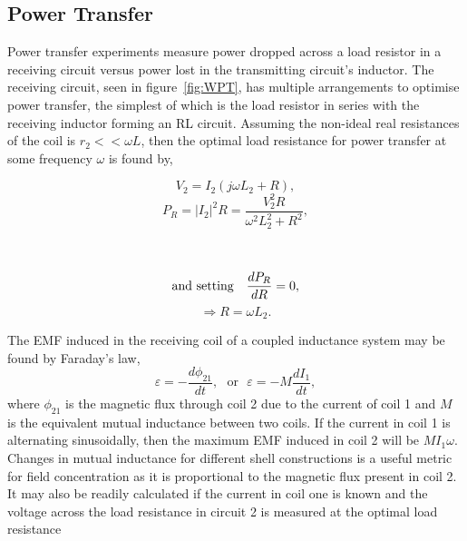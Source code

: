 \documentclass[11pt]{iopart}
\begin{document}
\subsection{Power Transfer}
Power transfer experiments measure power dropped across a load
resistor in a receiving circuit versus power lost in the transmitting
circuit's inductor. The receiving circuit, seen in
figure~\ref{fig:WPT}, has multiple arrangements to optimise power
transfer, the simplest of which is the load resistor in series with
the receiving inductor forming an RL circuit. Assuming the non-ideal
real resistances of the coil is $r_2 << \omega L$, then the optimal
load resistance for power transfer at some frequency $\omega$ is found
by,
\vspace{-0.5em}
\begin{center}
\begin{minipage}{0.4\linewidth}
\begin{equation}
  V_2 = I_2 (j\omega L_2 + R),  
\end{equation}
\begin{equation}
  P_R = |I_2|^2R = \frac{V_2^2R}{\omega^2L_2^2 + R^2},
\end{equation}
\end{minipage}
~~
\vrule
\begin{minipage}{0.4\linewidth}
  $$\text{and setting\quad} \frac{dP_R}{dR} = 0,$$ 
\begin{equation}
  \Rightarrow R = \omega L_2.
  \label{eqn:RL-max}
\end{equation}
\end{minipage}
\end{center}
The EMF induced in the receiving coil of a coupled inductance system
may be found by Faraday's law,
\vspace{-0.5em}
\begin{equation}
  \varepsilon = -\frac{d\phi_{21}}{dt},~~~\text{or}~~~\varepsilon = -M\frac{dI_{1}}{dt},
  \label{eqn:M}
\end{equation}
where $\phi_{21}$ is the magnetic flux through coil 2 due to the
current of coil 1 and $M$ is the equivalent mutual inductance between
two coils.
If the current in coil 1 is alternating sinusoidally, then the
maximum EMF induced in coil 2 will be $M I_1 \omega$. Changes in
mutual inductance for different shell constructions is a useful metric
for field concentration as it is proportional to the magnetic flux
present in coil 2. It may also be readily calculated if the current in
coil one is known and the voltage across the load resistance in
circuit 2 is measured at the optimal load resistance
\end{document}
